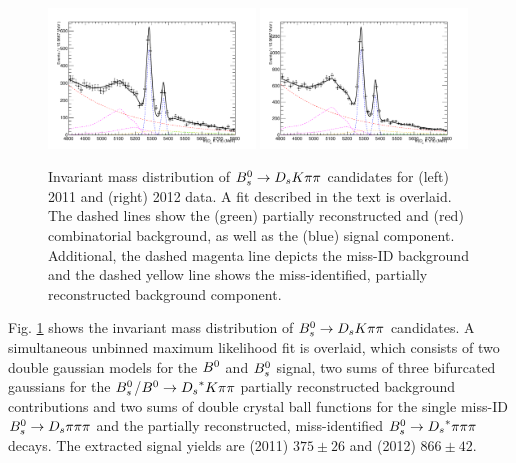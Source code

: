 \begin{figure}[h]
\includegraphics[height=7.cm,width=0.49\textwidth]{figs/BmassFit_sim11.pdf}
\includegraphics[height=7.cm,width=0.49\textwidth]{figs/BmassFit_sim12.pdf}
\caption{Invariant mass distribution of ${{B}^0_{s}}\rightarrow{\ensuremath{{D}_{s}}}{\ensuremath{K}}{\ensuremath{\pi}}{\ensuremath{\pi}}$ candidates for (left) 2011 and (right) 2012 data.
A fit described in the text is overlaid. The dashed lines show the (green) partially reconstructed and (red) combinatorial background, as well as the (blue) signal component. 
Additional, the dashed magenta line depicts the miss-ID background and the dashed yellow line shows the miss-identified, partially reconstructed background component.}
\label{fig: BsDsKpipiFit}
\end{figure}


Fig. \ref{fig: BsDsKpipiFit} shows the invariant mass distribution of ${{B}^0_{s}}\rightarrow{\ensuremath{{D}_{s}}}{\ensuremath{K}}{\ensuremath{\pi}}{\ensuremath{\pi}}$ candidates. 
A simultaneous unbinned maximum likelihood fit is overlaid, which consists of two double gaussian models for the ${{B}^0}$ and ${{B}^0_{s}}$ signal, two sums of three bifurcated gaussians for the ${{B}^0_{s}}$/${{B}^0}\rightarrow{\ensuremath{{D}_{s}}}^{*}{K}{\pi}{\pi}$ partially reconstructed background contributions and two sums of double crystal ball functions for the single miss-ID ${{B}^0_{s}}\rightarrow{\ensuremath{{D}_{s}}}{\ensuremath{\pi}}{\ensuremath{\pi}}{\ensuremath{\pi}}$ and the partially reconstructed, miss-identified ${{B}^0_{s}}\rightarrow{\ensuremath{{D}_{s}}}^{*}{\pi}{\pi}{\pi}$ decays. \newline
The extracted signal yields are (2011) $375 \pm  26$ and (2012) $866 \pm 42$.  


